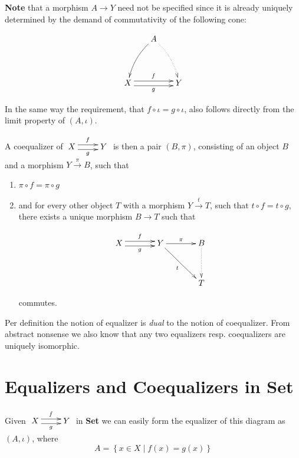 \documentclass[a4paper]{amsart}            %
\theoremstyle{plain}                                               %
\begin{document}
\textbf{Note} that a morphism $A \rightarrow Y$ need not be specified since it is already uniquely determined by the demand of commutativity of the following cone:

\begin{align*} \xymatrix@=0.6cm{&A \ar@/_/[ddl] \ar@{.>}@/^/[ddr] \\ & & \\X \ar@<0.66ex>[rr]^f \ar@<-0.66ex>[rr]_g	 & & Y}
\end{align*}

In the same way the requirement, that $f \circ \iota = g \circ \iota$, also follows directly from the limit property of $(A, \iota)$.

A coequalizer of $\xymatrix{X \ar@<0.66ex>[r]^{f} \ar@<-0.66ex>[r]_{g} & Y}$ is then a pair $(B,\pi)$, consisting of an object $B$ and a morphism $Y \xrightarrow{\pi} B$, such that

\begin{enumerate}

\item $\pi \circ f = \pi \circ g$
\bigskip
\item and for every other object $T$ with a morphism $Y \xrightarrow{t} T$, such that $t \circ f = t \circ g$, there exists a unique morphism $B \rightarrow T$ such that 

\begin{align*} \xymatrix@+=1.25cm{X \ar@<0.66ex>[r]^f \ar@<-0.66ex>[r]_g & Y \ar[dr]_t \ar[r]^{\pi} & B \ar@{.>}[d]\\
																								&	&	 T } \end{align*}
																										 
																										 commutes.
																										 																										 
\end{enumerate}																							

Per definition the notion of equalizer is \emph{dual} to the notion of coequalizer. From abstract nonsense we also know that any two equalizers resp. coequalizers are uniquely isomorphic.
\bigskip

\section*{\textbf{Equalizers and Coequalizers in Set}}

Given $\xymatrix{X \ar@<0.66ex>[r]^f \ar@<-0.66ex>[r]_g & Y}$ in \textbf{Set} we can easily form the equalizer of this diagram as $(A,\iota)$, where
\begin{equation*}
A=\left\{x \in X \mid f(x)=g(x)\right\}
\end{equation*}
\end{document}
